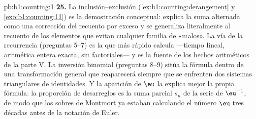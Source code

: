 \begin{solution}{pb:b1:counting:1}
\textbf{25.} La inclusión--exclusión
(\cref{ex:b1:counting:derangement} y \cref{exo:b1:counting:11}) es la
demostración conceptual: explica la suma alternada como una corrección
del recuento por exceso y se generaliza literalmente al recuento de los
elementos que evitan cualquier familia de  «malos». La vía de
la recurrencia (preguntas 5--7) es la que más rápido calcula ---tiempo
lineal, aritmética entera exacta, sin factoriales--- y es la fuente de
los hechos aritméticos de la parte V. La inversión binomial (preguntas
8--9) sitúa la fórmula dentro de una transformación general que
reaparecerá siempre que se enfrenten dos sistemas triangulares de
identidades. Y la aparición de $\eu$ la explica mejor la propia fórmula:
la proporción de desarreglos es la suma parcial $s_n$ de la serie de
$\eu^{-1}$, de modo que los sobres de Montmort ya estaban calculando el
número $\eu$ tres décadas antes de la notación de Euler.
\end{solution}
